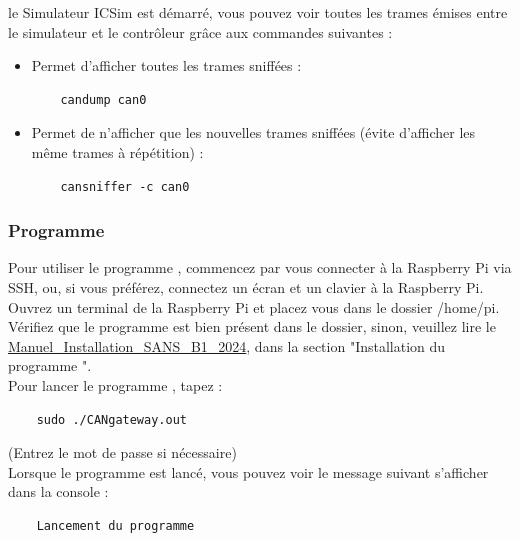le Simulateur ICSim est démarré, vous pouvez voir toutes les trames émises entre le simulateur et le contrôleur grâce aux commandes suivantes :
\begin{itemize}
    \item Permet d'afficher toutes les trames sniffées :
\vspace{-1.8\baselineskip}
\begin{lstlisting}
    candump can0
\end{lstlisting}
    \item Permet de n'afficher que les nouvelles trames sniffées (évite d'afficher les même trames à répétition) :
\vspace{-1.8\baselineskip}
\begin{lstlisting}
    cansniffer -c can0
\end{lstlisting}
\end{itemize}

\subsubsection{Programme {\nomLogiciel}}

Pour utiliser le programme {\nomLogiciel}, commencez par vous connecter à la Raspberry Pi via SSH, ou, si vous préférez, connectez un écran et un clavier à la Raspberry Pi.\\

Ouvrez un terminal de la Raspberry Pi et placez vous dans le dossier /home/pi. \\

Vérifiez que le programme {\nomLogiciel} est bien présent dans le dossier, sinon, veuillez lire le \hyperref[INST]{Manuel\_Installation\_SANS\_B1\_2024}, dans la section "Installation du programme {\nomLogiciel}".\\

Pour lancer le programme {\nomLogiciel}, tapez :
\vspace{-1.8\baselineskip}
\begin{lstlisting}
    sudo ./CANgateway.out
\end{lstlisting}
(Entrez le mot de passe si nécessaire)\\

Lorsque le programme est lancé, vous pouvez voir le message suivant s'afficher dans la console :
\vspace{-2.5\baselineskip}
\begin{lstlisting}
    Lancement du programme
\end{lstlisting}

